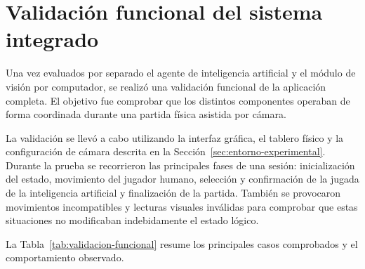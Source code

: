 \section{Validación funcional del sistema integrado}
\label{sec:validacion-sistema-integrado}

Una vez evaluados por separado el agente de inteligencia artificial y el módulo de visión por computador, se realizó una validación funcional de la aplicación completa. El objetivo fue comprobar que los distintos componentes operaban de forma coordinada durante una partida física asistida por cámara.

La validación se llevó a cabo utilizando la interfaz gráfica, el tablero físico y la configuración de cámara descrita en la Sección~\ref{sec:entorno-experimental}. Durante la prueba se recorrieron las principales fases de una sesión: inicialización del estado, movimiento del jugador humano, selección y confirmación de la jugada de la inteligencia artificial y finalización de la partida. También se provocaron movimientos incompatibles y lecturas visuales inválidas para comprobar que estas situaciones no modificaban indebidamente el estado lógico.

La Tabla~\ref{tab:validacion-funcional} resume los principales casos comprobados y el comportamiento observado.

